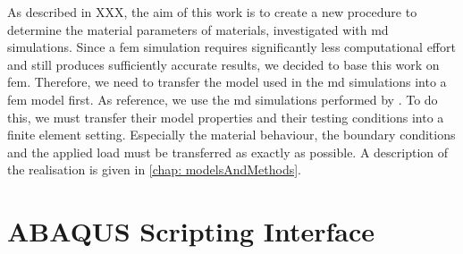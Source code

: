 As described in XXX, the aim of this work is to create a new procedure to determine the material parameters of materials, investigated with \acrshort{md} simulations. Since a \acrshort{fem} simulation requires significantly less computational effort and still produces sufficiently accurate results, we decided to base this work on \acrshort{fem}. Therefore, we need to transfer the model used in the \acrshort{md} simulations into a \acrshort{fem} model first. As reference, we use the \acrshort{md} simulations performed by \citet{ries_deciphering_nodate}. To do this, we must transfer their model properties and their testing conditions into a finite element setting. Especially the material behaviour, the boundary conditions and the applied load must be transferred as exactly as possible. A description of the realisation is given in \autoref{chap: modelsAndMethods}. 







\section{ABAQUS Scripting Interface} \label{sec: AbaqusBasics}

